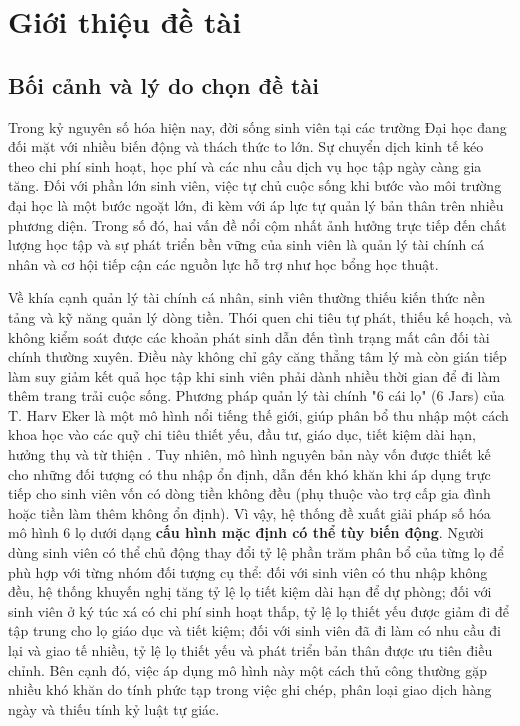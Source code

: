 \chapter{Giới thiệu đề tài}
\label{ch:gioi-thieu}

\section{Bối cảnh và lý do chọn đề tài}
Trong kỷ nguyên số hóa hiện nay, đời sống sinh viên tại các trường Đại học đang đối mặt với nhiều biến động và thách thức to lớn. Sự chuyển dịch kinh tế kéo theo chi phí sinh hoạt, học phí và các nhu cầu dịch vụ học tập ngày càng gia tăng. Đối với phần lớn sinh viên, việc tự chủ cuộc sống khi bước vào môi trường đại học là một bước ngoặt lớn, đi kèm với áp lực tự quản lý bản thân trên nhiều phương diện. Trong số đó, hai vấn đề nổi cộm nhất ảnh hưởng trực tiếp đến chất lượng học tập và sự phát triển bền vững của sinh viên là quản lý tài chính cá nhân và cơ hội tiếp cận các nguồn lực hỗ trợ như học bổng học thuật.

Về khía cạnh quản lý tài chính cá nhân, sinh viên thường thiếu kiến thức nền tảng và kỹ năng quản lý dòng tiền. Thói quen chi tiêu tự phát, thiếu kế hoạch, và không kiểm soát được các khoản phát sinh dẫn đến tình trạng mất cân đối tài chính thường xuyên. Điều này không chỉ gây căng thẳng tâm lý mà còn gián tiếp làm suy giảm kết quả học tập khi sinh viên phải dành nhiều thời gian để đi làm thêm trang trải cuộc sống. Phương pháp quản lý tài chính "6 cái lọ" (6 Jars) của T. Harv Eker là một mô hình nổi tiếng thế giới, giúp phân bổ thu nhập một cách khoa học vào các quỹ chi tiêu thiết yếu, đầu tư, giáo dục, tiết kiệm dài hạn, hưởng thụ và từ thiện \cite{eker2005-6jars}. Tuy nhiên, mô hình nguyên bản này vốn được thiết kế cho những đối tượng có thu nhập ổn định, dẫn đến khó khăn khi áp dụng trực tiếp cho sinh viên vốn có dòng tiền không đều (phụ thuộc vào trợ cấp gia đình hoặc tiền làm thêm không ổn định). Vì vậy, hệ thống đề xuất giải pháp số hóa mô hình 6 lọ dưới dạng \textbf{cấu hình mặc định có thể tùy biến động}. Người dùng sinh viên có thể chủ động thay đổi tỷ lệ phần trăm phân bổ của từng lọ để phù hợp với từng nhóm đối tượng cụ thể: đối với sinh viên có thu nhập không đều, hệ thống khuyến nghị tăng tỷ lệ lọ tiết kiệm dài hạn để dự phòng; đối với sinh viên ở ký túc xá có chi phí sinh hoạt thấp, tỷ lệ lọ thiết yếu được giảm đi để tập trung cho lọ giáo dục và tiết kiệm; đối với sinh viên đã đi làm có nhu cầu đi lại và giao tế nhiều, tỷ lệ lọ thiết yếu và phát triển bản thân được ưu tiên điều chỉnh. Bên cạnh đó, việc áp dụng mô hình này một cách thủ công thường gặp nhiều khó khăn do tính phức tạp trong việc ghi chép, phân loại giao dịch hàng ngày và thiếu tính kỷ luật tự giác.

